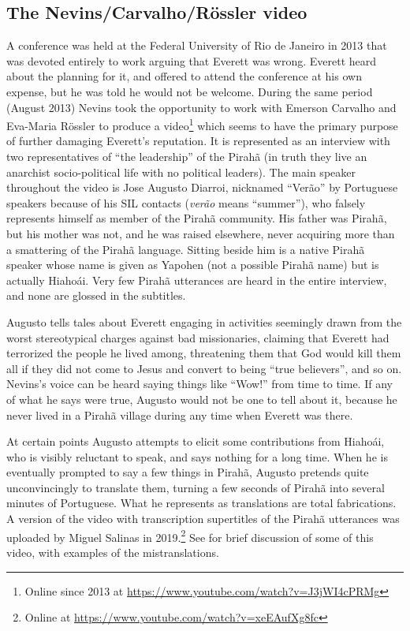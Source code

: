 \documentclass[output=paper,colorlinks,citecolor=brown
]{langscibook}
\begin{document}
\subsection{The Nevins/Carvalho/R{\"o}ssler video}

A conference was held at the Federal University of Rio de Janeiro in
2013 that was devoted entirely to work arguing that Everett was wrong.
Everett heard about the planning for it, and offered to attend the
conference at his own expense, but he was told he would not be welcome.
During the same period (August 2013) Nevins took the opportunity to
work with Emerson Carvalho and Eva-Maria R{\"o}ssler to produce a
video\footnote{\label{augustovideo}
   Online since 2013 at
   \url{https://www.youtube.com/watch?v=J3jWI4cPRMg}}
which seems to have the primary purpose of further damaging Everett's
reputation. It is represented as an interview with two representatives
of ``the leadership'' of the Pirah{\~a} (in truth they live an
anarchist socio-political life with no political leaders). The main
speaker throughout the video is Jose Augusto Diarroi, nicknamed
``Ver{\~a}o'' by Portuguese speakers because of his SIL contacts
(\textit{ver{\~a}o} means ``summer''), who falsely represents himself
as member of the Pirah{\~a} community. His father was Pirah{\~a}, but
his mother was not, and he was raised elsewhere, never acquiring more
than a smattering of the Pirah{\~a} language. Sitting beside him is
a native Pirah{\~a} speaker whose name is given as Yapohen (not a
possible Pirah{\~a} name) but is actually Hiaho{\'a}i. Very few
Pirah{\~a} utterances are heard in the entire interview, and none are
glossed in the subtitles.

Augusto tells tales about Everett engaging in activities seemingly
drawn from the worst stereotypical charges against bad missionaries,
claiming that Everett had terrorized the people he lived among,
threatening them that God would kill them all if they did not come
to Jesus and convert to being ``true believers'', and so on. Nevins's
voice can be heard saying things like ``Wow!'' from time to time.
If any of what he says were true, Augusto would not be one to tell
about it, because he never lived in a Pirah{\~a} village during any
time when Everett was there.

At certain points Augusto attempts to elicit some contributions from
Hiaho{\'a}i, who is visibly reluctant to speak, and says nothing for
a long time. When he is eventually prompted to say a few things in
Pirah{\~a}, Augusto pretends quite unconvincingly to translate them,
turning a few seconds of Pirah{\~a} into several minutes of Portuguese.
What he represents as translations are total fabrications. A version
of the video with transcription supertitles of the Pirah{\~a} utterances
was uploaded by Miguel Salinas in 2019.\footnote{\label{salinasvideo}
   Online at \url{https://www.youtube.com/watch?v=xeEAufXg8fc}}
See \citet[781, fn.\,3]{EverGibs19} for brief
discussion of some of this video, with examples of the mistranslations.
\end{document}
